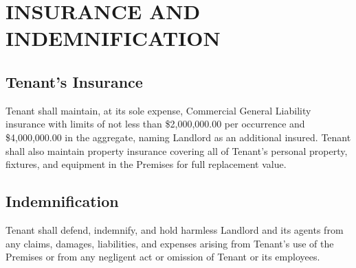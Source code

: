 \section{INSURANCE AND INDEMNIFICATION}
\subsection{Tenant's Insurance}
Tenant shall maintain, at its sole expense, Commercial General Liability insurance with limits of not less than \$2,000,000.00 per occurrence and \$4,000,000.00 in the aggregate, naming Landlord as an additional insured. Tenant shall also maintain property insurance covering all of Tenant's personal property, fixtures, and equipment in the Premises for full replacement value.

\subsection{Indemnification}
Tenant shall defend, indemnify, and hold harmless Landlord and its agents from any claims, damages, liabilities, and expenses arising from Tenant's use of the Premises or from any negligent act or omission of Tenant or its employees.
